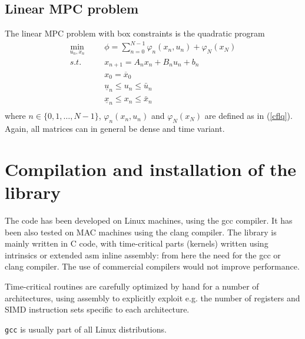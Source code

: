 \documentclass[a4paper]{report}
\begin{document}
\section{Linear MPC problem}

The linear MPC problem with box constraints is the quadratic program
\begin{equation}
\begin{aligned}
\min_{u_n,x_n} &&& \phi = \sum_{n=0}^{N-1} \varphi_n(x_n,u_n) + \varphi_N(x_N) \\
s.t. &&& x_{n+1} = A_nx_n+B_nu_n+b_n \\
&&& x_0 = \overline x_0 \\
&&& \underline{u}_n\leq u_n\leq\bar{u}_n \\
&&& \underline{x}_n\leq x_n\leq\bar{x}_n \\
\end{aligned}
\label{lmpc}
\end{equation}
where $n\in\{0,1,\dots,N-1\}$, $\varphi_n(x_n,u_n)$ and $\varphi_N(x_N)$ are defined as in (\ref{cflq}). Again, all matrices can in general be dense and time variant.



\chapter{Compilation and installation of the library}

The code has been developed on Linux machines, using the gcc compiler.
It has been also tested on MAC machines using the clang compiler.
The library is mainly written in C code, with time-critical parts (kernels) written using intrinsics or extended asm inline assembly: from here the need for the gcc or clang compiler.
The use of commercial compilers would not improve performance.

Time-critical routines are carefully optimized by hand for a number of architectures, using assembly to explicitly exploit e.g. the number of registers and SIMD instruction sets specific to each architecture.


{\tt gcc} is usually part of all Linux distributions.
\end{document}
